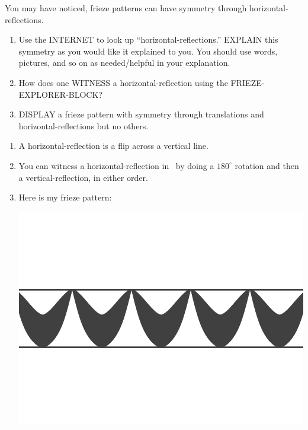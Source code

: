 \documentclass[noauthor,nooutcomes,hints,handout]{ximera}
\begin{document}
\begin{question}
  You may have noticed, frieze patterns can have symmetry through
  horizontal-reflections.
  \begin{enumerate}
  \item Use the INTERNET to look up ``horizontal-reflections.''
    EXPLAIN this symmetry as you would like it explained to you. You
    should use words, pictures, and so on as needed/helpful in your
    explanation.
  \item How does one WITNESS a horizontal-reflection using the
    FRIEZE-EXPLORER-BLOCK?
  \item DISPLAY a frieze pattern with symmetry through translations
    and horizontal-reflections but no others.
  \end{enumerate}
  \begin{freeResponse}
    \begin{enumerate}
    \item A horizontal-reflection is a flip across a vertical line.
    \item You can witness a horizontal-reflection in \snap\ by doing a
      $180^\circ$ rotation and then a vertical-reflection, in either
      order.
    \item Here is my frieze pattern:
      \begin{center}
        \includegraphics[width=.6\textwidth]{ansFv.png}
      \end{center}
    \end{enumerate}
  \end{freeResponse}
\end{question}
\mynewpage
\end{document}
